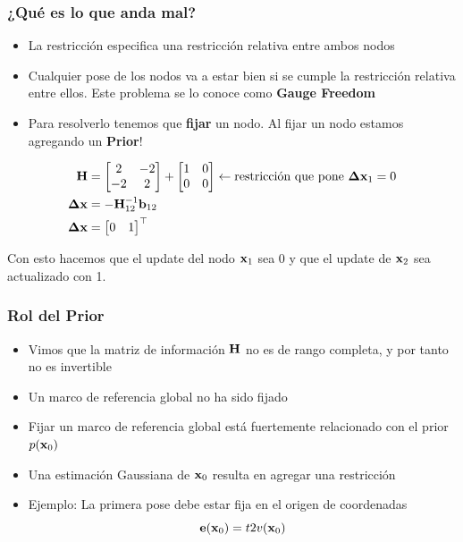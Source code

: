 \begin{frame}
    \frametitle{¿Qué es lo que anda mal?}
    
    \begin{itemize}
        \item La restricción especifica una restricción relativa entre ambos nodos
        \item Cualquier pose de los nodos va a estar bien si se cumple la restricción relativa entre ellos. Este problema se lo conoce como {\bf Gauge Freedom}
        \item Para resolverlo tenemos que {\bf fijar} un nodo. Al fijar un nodo estamos agregando un {\bf Prior}!
    \end{itemize}

    \begin{align*}
        \boldsymbol{\mathbf{H}} &=
        \begin{bmatrix}
            2 & -2\\
            -2 & 2
        \end{bmatrix}
        +
        \begin{bmatrix}
            1 & 0\\
            0 & 0
        \end{bmatrix} \leftarrow \text{restricción que pone } \boldsymbol{\mathbf{\Delta}}\boldsymbol{\mathbf{x}}_{1} = 0\\
        \boldsymbol{\mathbf{\Delta}}\boldsymbol{\mathbf{x}} &= -{\boldsymbol{\mathbf{H}}}^{-1}_{12} \boldsymbol{\mathbf{b}}_{12}\\
        \boldsymbol{\mathbf{\Delta}}\boldsymbol{\mathbf{x}} &=
        \begin{bmatrix}
            0 & 1
        \end{bmatrix}^{\top}
    \end{align*}
    
    Con esto hacemos que el update del nodo $\boldsymbol{\mathbf{x}}_{1}$ sea 0 y que el update de $\boldsymbol{\mathbf{x}}_{2}$ sea actualizado con 1.
\end{frame}

\begin{frame}
    \frametitle{Rol del Prior}
    
    \begin{itemize}
        \item Vimos que la matriz de información $\boldsymbol{\mathbf{H}}$ no es de rango completa, y por tanto no es invertible
        \item Un marco de referencia global no ha sido fijado
        \item Fijar un marco de referencia global está fuertemente relacionado con el prior $p(\boldsymbol{\mathbf{x}}_{0})$
        \item Una estimación Gaussiana de $\boldsymbol{\mathbf{x}}_{0}$ resulta en agregar una restricción
        \item Ejemplo: La primera pose debe estar fija en el origen de coordenadas
        \begin{equation*}
            \boldsymbol{\mathbf{e}}(\boldsymbol{\mathbf{x}}_{0}) = t2v(\boldsymbol{\mathbf{x}}_{0})
        \end{equation*}
    \end{itemize}
    
\end{frame}

